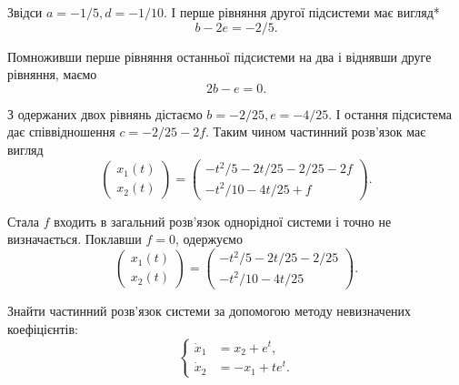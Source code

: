 \begin{solution}
	Звідси $a = - 1 / 5, d = - 1 / 10$. І перше рівняння другої підсистеми має вигляд*
	\begin{equation*}
		b - 2 e = - 2 / 5.
	\end{equation*}

	Помноживши перше рівняння останньої підсистеми на два і віднявши друге рівняння, маємо
	\begin{equation*}
		2 b - e = 0.
	\end{equation*}

	З одержаних двох рівнянь дістаємо $b = - 2 / 25, e = - 4 / 25$. І остання підсистема дає співвідношення $c = - 2 / 25 - 2 f$. Таким чином частинний розв'язок має вигляд
	\begin{equation*}
		\begin{pmatrix} x_1(t) \\ x_2(t) \end{pmatrix} = \begin{pmatrix} - t^2 / 5 - 2 t / 25 - 2 / 25 - 2 f \\ - t^2 / 10 - 4 t / 25 + f \end{pmatrix}.
	\end{equation*}

	Стала $f$ входить в загальний розв'язок однорідної системи і точно не визначається. Поклавши $f = 0$, одержуємо
	\begin{equation*}
		\begin{pmatrix} x_1(t) \\ x_2(t) \end{pmatrix} = \begin{pmatrix} - t^2 / 5 - 2 t / 25 - 2 / 25 \\ - t^2 / 10 - 4 t / 25 \end{pmatrix}.
	\end{equation*}
\end{solution}

\begin{example}
	Знайти частинний розв'язок системи за допомогою методу невизначених коефіцієнтів:
	\begin{equation*}
		\left\{
			\begin{aligned}
				\dot x_1 &= x_2 + e^t, \\
				\dot x_2 &= - x_1 + t e^t.
			\end{aligned}
		\right.
	\end{equation*}
\end{example}

